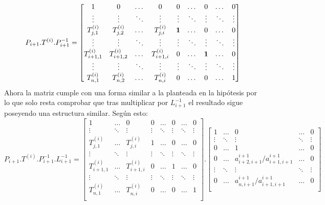 \[P_{i+1}.T^{(i)}.P_{i+1}^{-1}=
\begin{bmatrix}
    1 &  0 & \dots & 0 & 0 & \dots &  0 & \dots & 0 \\
   \vdots  & \vdots & \ddots & \vdots & \vdots & \ddots & \vdots & \ddots & \vdots \\
   T_{j,1}^{(i)} &  T_{j,2}^{(i)} & \dots &  T_{j,i}^{(i)} &  {\bf 1} & \dots  & 0 & \dots & 0 \\
   \vdots  & \vdots & \ddots & \vdots & \vdots & \ddots & \vdots & \ddots & \vdots \\
    T_{i+1,1}^{(i)} &  T_{i+1,2}^{(i)} & \dots &  T_{i+1,i}^{(i)} & 0 & \dots  &  {\bf 1} & \dots & 0 \\
   \vdots  & \vdots & \ddots & \vdots & \vdots & \ddots & \vdots & \ddots & \vdots \\
    T_{n,1}^{(i)} &  T_{n,2}^{(i)} & \dots &  T_{n,i}^{(i)} & 0 & \dots & 0 & \dots & 1 \\
\end{bmatrix}
\]
Ahora la matriz cumple con una forma similar a la planteada en la hipótesis por lo que solo resta comprobar que tras multiplicar por $L_{i+1}^{-1}$ el resultado sigue poseyendo una estructura similar. Según esto:\\

\[P_{i+1}.T^{(i)}.P_{i+1}^{-1}.L_{i+1}^{-1}=
\begin{bmatrix}
    1 & \dots & 0 & 0 & \dots &  0 & \dots & 0 \\
   \vdots & \ddots & \vdots & \vdots & \ddots & \vdots & \ddots & \vdots \\
   T_{j,1}^{(i)} & \dots &  T_{j,i}^{(i)} & 1 & \dots  & 0 & \dots & 0 \\
   \vdots  & \ddots & \vdots & \vdots & \ddots & \vdots & \ddots & \vdots \\
    T_{i+1,1}^{(i)} & \dots &  T_{i+1,i}^{(i)} & 0 & \dots  & 1 & \dots & 0 \\
   \vdots  & \ddots & \vdots & \vdots & \ddots & \vdots & \ddots & \vdots \\
    T_{n,1}^{(i)} & \dots &  T_{n,i}^{(i)} & 0 & \dots & 0 & \dots & 1 \\
\end{bmatrix}.
\begin{bmatrix}
    1  & \dots & 0 & \dots & 0 \\
   \vdots  & \ddots & \vdots & \ddots & \vdots \\
   0  & \dots & 1 & \dots & 0 \\
   0  & \dots & a_{i+2,i+1}^{i+1}/a_{i+1,i+1}^{i+1} & \dots & 0 \\
   \vdots  & \ddots & \vdots & \ddots & \vdots \\
   0  & \dots & a_{n,i+1}^{i+1}/a_{i+1,i+1}^{i+1} & \dots & 0 \\
\end{bmatrix}
\]

